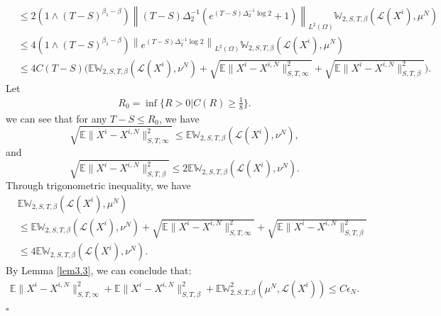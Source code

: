\documentclass[12pt]{article}
\def\L{\mathscr{L}}
\def\E{\mathbb E}
\def\W{\mathbb{W}}
\newenvironment{proof}{{\noindent\it Proof.}\ }{\hfill $\square$\par}
\numberwithin{equation}{section}
\begin{document}
\begin{proof}
\begin{align*}
		&\leq 2(1\wedge (T-S)^{\beta_1-\beta}) \left\|(T-S)\Delta_2^{-1}\left(e^{(T-S)\Delta_2^{-1}\log 2}+1\right)\right\|_{L^2(\Omega)}\W_{2,S,T,\beta}(\L(X^i),\mu^N)\\
		&\leq 4(1\wedge (T-S)^{\beta_1-\beta})  \left\|e^{(T-S)\Delta_2^{-1}\log 2}\right\|_{L^2(\Omega)}\W_{2,S,T,\beta}(\L(X^i),\mu^N)\\
		&\leq 4C(T-S)\Big(\E\W_{2,S,T,\beta}(\L(X^i),\nu^N)+\sqrt{\E\|X^i-X^{i,N}\|^2_{S,T,\infty}}+\sqrt{\E\|X^i-X^{i,N}\|^2_{S,T,\beta}}\Big).
	\end{align*}
	Let\begin{align*}
		R_0=\inf\Big\{ R>0|C(R)\geq \frac{1}{8}\Big\}.
	\end{align*}
	we can see that for any $T-S\leq R_0$, we have
	\begin{equation}
		\sqrt{\E\|X^i-X^{i,N}\|^2_{S,T,\infty}}\leq \E\W_{2,S,T,\beta}(\L(X^i),\nu^N),
	\end{equation}
	and \begin{equation}
		\sqrt{\E\|X^i-X^{i,N}\|^2_{S,T,\beta}}\leq 2\E\W_{2,S,T,\beta}(\L(X^i),\nu^N).
	\end{equation}
	Through trigonometric inequality, we have
	\begin{equation}
		\begin{aligned}
			&\E\W_{2,S,T,\beta}(\L(X^i),\mu^N)\\
			&\leq \E\W_{2,S,T,\beta}(\L(X^i),\nu^N)+\sqrt{\E\|X^i-X^{i,N}\|^2_{S,T,\infty}}+\sqrt{\E\|X^i-X^{i,N}\|^2_{S,T,\beta}}\\
			&\leq 4\E\W_{2,S,T,\beta}(\L(X^i),\nu^N).
		\end{aligned}
	\end{equation}
	By Lemma \ref{lem3.3}, we can conclude that:
		\begin{equation}
		\begin{aligned}
			{\E\|X^i-X^{i,N}\|^2_{S,T,\infty}}+{\E\|X^i-X^{i,N}\|^2_{S,T,\beta}}+\E\W^2_{2,S,T,\beta}(\mu^N,\L(X^i))\leq C\epsilon_N.
		\end{aligned}
	\end{equation}
\end{proof}
\end{document}
